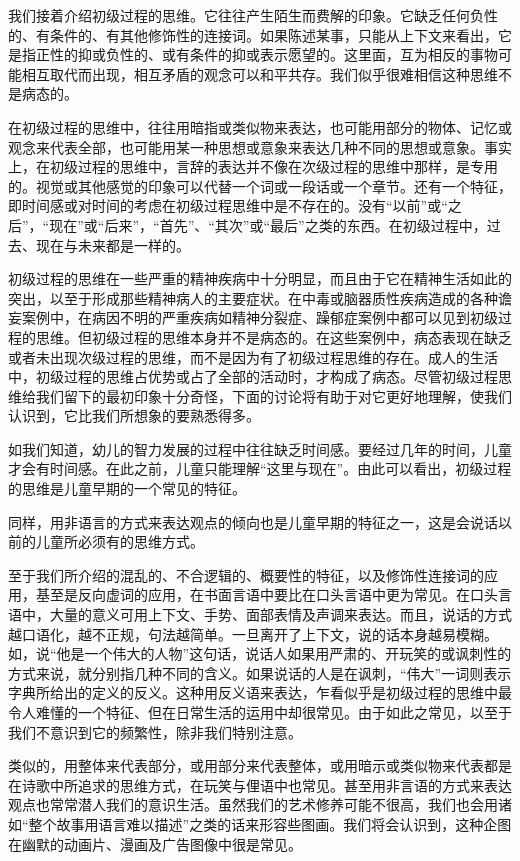 \documentclass[UTF8,10pt,a4paper,openany]{book}
\begin{document}
我们接着介绍初级过程的思维。它往往产生陌生而费解的印象。它缺乏任何负性的、有条件的、有其他修饰性的连接词。如果陈述某事，只能从上下文来看出，它是指正性的抑或负性的、或有条件的抑或表示愿望的。这里面，互为相反的事物可能相互取代而出现，相互矛盾的观念可以和平共存。我们似乎很难相信这种思维不是病态的。

在初级过程的思维中，往往用暗指或类似物来表达，也可能用部分的物体、记忆或观念来代表全部，也可能用某一种思想或意象来表达几种不同的思想或意象。事实上，在初级过程的思维中，言辞的表达并不像在次级过程的思维中那样，是专用的。视觉或其他感觉的印象可以代替一个词或一段话或一个章节。还有一个特征，即时间感或对时间的考虑在初级过程思维中是不存在的。没有“以前”或“之后”，“现在”或“后来”，“首先”、“其次”或“最后”之类的东西。在初级过程中，过去、现在与未来都是一样的。

初级过程的思维在一些严重的精神疾病中十分明显，而且由于它在精神生活如此的突出，以至于形成那些精神病人的主要症状。在中毒或脑器质性疾病造成的各种谵妄案例中，在病因不明的严重疾病如精神分裂症、躁郁症案例中都可以见到初级过程的思维。但初级过程的思维本身并不是病态的。在这些案例中，病态表现在缺乏或者未出现次级过程的思维，而不是因为有了初级过程思维的存在。成人的生活中，初级过程的思维占优势或占了全部的活动时，才构成了病态。尽管初级过程思维给我们留下的最初印象十分奇怪，下面的讨论将有助于对它更好地理解，使我们认识到，它比我们所想象的要熟悉得多。

如我们知道，幼儿的智力发展的过程中往往缺乏时间感。要经过几年的时间，儿童才会有时间感。在此之前，儿童只能理解“这里与现在”。由此可以看出，初级过程的思维是儿童早期的一个常见的特征。

同样，用非语言的方式来表达观点的倾向也是儿童早期的特征之一，这是会说话以前的儿童所必须有的思维方式。

至于我们所介绍的混乱的、不合逻辑的、概要性的特征，以及修饰性连接词的应用，基至是反向虚词的应用，在书面言语中要比在口头言语中更为常见。在口头言语中，大量的意义可用上下文、手势、面部表情及声调来表达。而且，说话的方式越口语化，越不正规，句法越简单。一旦离开了上下文，说的话本身越易模糊。如，说“他是一个伟大的人物”这句话，说话人如果用严肃的、开玩笑的或讽刺性的方式来说，就分别指几种不同的含义。如果说话的人是在讽刺，“伟大”一词则表示字典所给出的定义的反义。这种用反义语来表达，乍看似乎是初级过程的思维中最令人难懂的一个特征、但在日常生活的运用中却很常见。由于如此之常见，以至于我们不意识到它的频繁性，除非我们特别注意。

类似的，用整体来代表部分，或用部分来代表整体，或用暗示或类似物来代表都是在诗歌中所追求的思维方式，在玩笑与俚语中也常见。甚至用非言语的方式来表达观点也常常潜人我们的意识生活。虽然我们的艺术修养可能不很高，我们也会用诸如“整个故事用语言难以描述”之类的话来形容些图画。我们将会认识到，这种企图在幽默的动画片、漫画及广告图像中很是常见。
\end{document}
